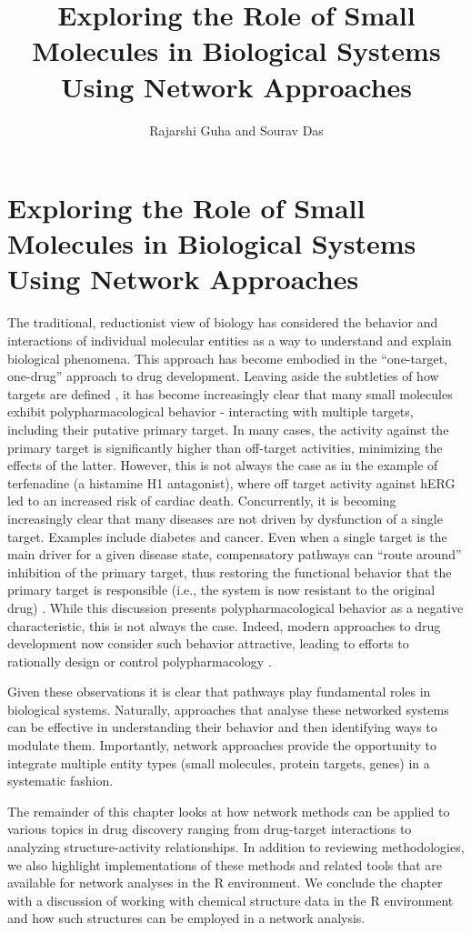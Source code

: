 \documentclass[]{book}
\title{Exploring the Role of Small Molecules in Biological Systems Using Network Approaches}
\author{Rajarshi Guha and Sourav Das}
\begin{document}
\frontmatter
\mainmatter

\chapter{Exploring the Role of Small Molecules in Biological Systems
  Using Network Approaches}

The traditional, reductionist view of biology has considered the
behavior and interactions of individual molecular entities as a way to
understand and explain biological phenomena. This approach has become
embodied in the ``one-target, one-drug'' approach to drug
development. Leaving aside the subtleties of how targets are defined
\cite{Imming:2006lt}, it has become increasingly clear that many small
molecules exhibit polypharmacological behavior - interacting with
multiple targets, including their putative primary target. In many
cases, the activity against the primary target is significantly higher
than off-target activities, minimizing the effects of the
latter. However, this is not always the case as in the example of
terfenadine (a histamine H1 antagonist), where off target activity
against hERG \cite{Crumb:1995it} led to an increased risk of cardiac
death. Concurrently, it is becoming increasingly clear that many
diseases are not driven by dysfunction of a single target. Examples
include diabetes and cancer. Even when a single target is the main
driver for a given disease state, compensatory pathways can ``route
around'' inhibition of the primary target, thus restoring the
functional behavior that the primary target is responsible (i.e., the
system is now resistant to the original drug)
\cite{Sierra:2010mz,Dienstmann:2012qr}. While this discussion presents
polypharmacological behavior as a negative characteristic, this is not
always the case. Indeed, modern approaches to drug development now
consider such behavior attractive, leading to efforts to rationally
design or control polypharmacology
\cite{Gujral:2014dp,Ciceri:2014fv,Metz:2010ys}.

Given these observations it is clear that pathways play fundamental
roles in biological systems. Naturally, approaches that analyse these
networked systems can be effective in understanding their behavior and
then identifying ways to modulate them. Importantly, network
approaches provide the opportunity to integrate multiple entity types
(small molecules, protein targets, genes) in a systematic fashion.

The remainder of this chapter looks at how network methods can be
applied to various topics in drug discovery ranging from drug-target
interactions to analyzing structure-activity relationships. In
addition to reviewing methodologies, we also highlight implementations
of these methods and related tools that are available for network
analyses in the R environment. We conclude the chapter with a
discussion of working with chemical structure data in the R
environment and how such structures can be employed in a network
analysis.
\end{document}
